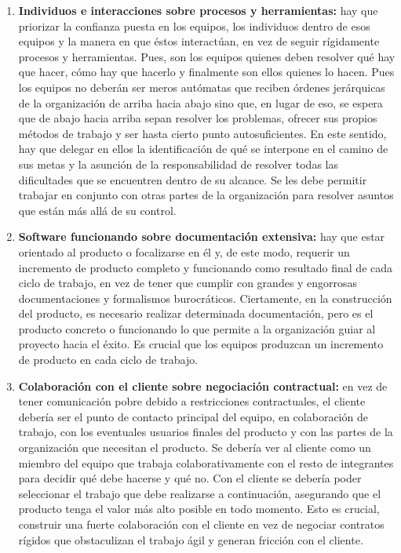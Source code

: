 \begin{enumerate}

\item \textbf{Individuos e interacciones sobre procesos y herramientas:} hay que priorizar la confianza puesta en los equipos, los individuos dentro de esos equipos y la manera en que éstos interactúan, en vez de seguir rígidamente procesos y herramientas. Pues, son los equipos quienes deben resolver qué hay que hacer, cómo hay que hacerlo y finalmente son ellos quienes lo hacen. Pues los equipos no deberán ser meros autómatas que reciben órdenes jerárquicas de la organización de arriba hacia abajo sino que, en lugar de eso, se espera que de abajo hacia arriba sepan resolver los problemas, ofrecer sus propios métodos de trabajo y ser hasta cierto punto autosuficientes. En este sentido, hay que delegar en ellos la identificación de qué se interpone en el camino de sus metas y la asunción de la responsabilidad de resolver todas las dificultades que se encuentren dentro de su alcance. Se les debe permitir trabajar en conjunto con otras partes de la organización para resolver asuntos que están más allá de su control.

\item \textbf{Software funcionando sobre documentación extensiva:} hay que estar orientado al producto o focalizarse en él y, de este modo, requerir un incremento de producto completo y funcionando como resultado final de cada ciclo de trabajo, en vez de tener que cumplir con grandes y engorrosas documentaciones y formalismos burocráticos. Ciertamente, en la construcción del producto, es necesario realizar determinada documentación, pero es el producto concreto o funcionando lo que permite a la organización guiar al proyecto hacia el éxito. Es crucial que los equipos produzcan un incremento de producto en cada ciclo de trabajo.

\item \textbf{Colaboración con el cliente sobre negociación contractual:} en vez de tener comunicación pobre debido a restricciones contractuales, el cliente debería ser el punto de contacto principal del equipo, en colaboración de trabajo, con los eventuales usuarios finales del producto y con las partes de la organización que necesitan el producto. Se debería ver al cliente como un miembro del equipo que trabaja colaborativamente con el resto de integrantes para decidir qué debe hacerse y qué no. Con el cliente se debería poder seleccionar el trabajo que debe realizarse a continuación, asegurando que el producto tenga el valor más alto posible en todo momento. Esto es crucial, construir una fuerte colaboración con el cliente en vez de negociar contratos rígidos que obstaculizan el trabajo ágil y generan fricción con el cliente.


\end{enumerate}

